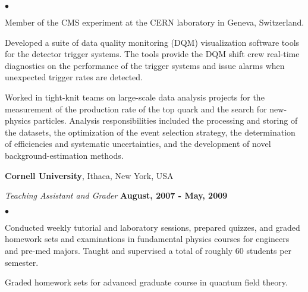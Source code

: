 \documentclass[margin,line]{res}
\newenvironment{list2}{
  \begin{list}{$\bullet$}{%
      \setlength{\itemsep}{0in}
      \setlength{\parsep}{0in} \setlength{\parskip}{0in}
      \setlength{\topsep}{0in} \setlength{\partopsep}{0in}
      \setlength{\leftmargin}{0.2in}}}{\end{list}}
\begin{document}
\begin{resume}
\begin{list2}
\item Member of the CMS experiment at the CERN laboratory in Geneva,
Switzerland.
\item Developed a suite of data quality monitoring (DQM) visualization
  software tools for the detector trigger systems. The tools provide
  the DQM shift crew real-time diagnostics on the performance of the
  trigger systems and issue alarms when unexpected trigger rates are
  detected.
\item Worked in tight-knit teams on large-scale data analysis projects
  for the measurement of the production rate of the top quark and the
  search for new-physics particles.  Analysis responsibilities
  included the processing and storing of the datasets, the
  optimization of the event selection strategy, the determination of
  efficiencies and systematic uncertainties, and the development of
  novel background-estimation methods.

\end{list2}

{\bf Cornell University}, Ithaca, New York, USA

\vspace*{-0.15in}
{\em Teaching Assistant and Grader} \hfill {\bf August, 2007 - May, 2009}\\
\begin{list2}
\item Conducted weekly tutorial and laboratory sessions, prepared
  quizzes, and graded homework sets and examinations in fundamental
  physics courses for engineers and pre-med majors.  Taught and
  supervised a total of roughly 60 students per semester.
\item Graded homework sets for advanced graduate course in quantum field theory.
\end{list2}


\end{resume}
\end{document}
